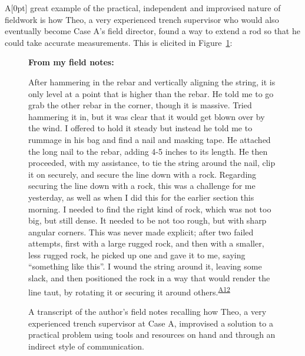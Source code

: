 \documentclass[
]{article}
\newcommand{\paragraphnumber}[1]{\marginnote{\color{lightgray}\tiny{#1}}[0pt]}
\begin{document}
A\paragraphnumber{[46]} great example of the practical, independent and
improvised nature of fieldwork is how Theo, a very experienced trench
supervisor who would also eventually become Case A's field director,
found a way to extend a rod so that he could take accurate measurements.
This is elicited in Figure~\ref{fig-nail}:

\begin{figure}

\begin{minipage}{\linewidth}
\textbf{From my field notes:}\end{minipage}%
\newline
\begin{minipage}{\linewidth}
After hammering in the rebar and vertically aligning the string, it is
only level at a point that is higher than the rebar. He told me to go
grab the other rebar in the corner, though it is massive. Tried
hammering it in, but it was clear that it would get blown over by the
wind. I offered to hold it steady but instead he told me to rummage in
his bag and find a nail and masking tape. He attached the long nail to
the rebar, adding 4-5 inches to its length. He then proceeded, with my
assistance, to tie the string around the nail, clip it on securely, and
secure the line down with a rock. Regarding securing the line down with
a rock, this was a challenge for me yesterday, as well as when I did
this for the earlier section this morning. I needed to find the right
kind of rock, which was not too big, but still dense. It needed to be
not too rough, but with sharp angular corners. This was never made
explicit; after two failed attempts, first with a large rugged rock, and
then with a smaller, less rugged rock, he picked up one and gave it to
me, saying ``something like this''. I wound the string around it,
leaving some slack, and then positioned the rock in a way that would
render the line taut, by rotating it or securing it around
others.\textsuperscript{\hyperref[sec-A12]{A12}}\end{minipage}%

\caption{\label{fig-nail}A transcript of the author's field notes
recalling how Theo, a very experienced trench supervisor at Case A,
improvised a solution to a practical problem using tools and resources
on hand and through an indirect style of communication.}

\end{figure}%
\end{document}
